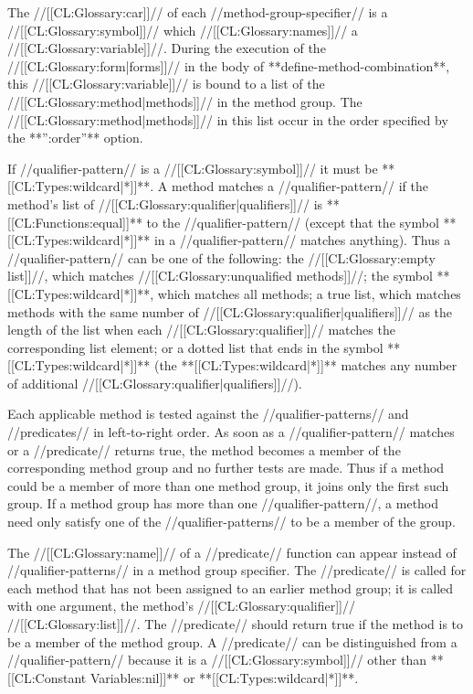 The //[[CL:Glossary:car]]// of each //method-group-specifier// is a //[[CL:Glossary:symbol]]// which //[[CL:Glossary:names]]// a //[[CL:Glossary:variable]]//. During the execution of the //[[CL:Glossary:form|forms]]// in the body of **define-method-combination**, this //[[CL:Glossary:variable]]// is bound to a list of the //[[CL:Glossary:method|methods]]// in the method group. The //[[CL:Glossary:method|methods]]// in this list occur in the order specified by the **'':order''** option.

If //qualifier-pattern// is a //[[CL:Glossary:symbol]]// it must be **[[CL:Types:wildcard|*]]**. A method matches a //qualifier-pattern// if the method's list of //[[CL:Glossary:qualifier|qualifiers]]// is **[[CL:Functions:equal]]** to the //qualifier-pattern// (except that the symbol **[[CL:Types:wildcard|*]]** in a //qualifier-pattern// matches anything). Thus a //qualifier-pattern// can be one of the following: the //[[CL:Glossary:empty list]]//, which matches //[[CL:Glossary:unqualified methods]]//; the symbol **[[CL:Types:wildcard|*]]**, which matches all methods; a true list, which matches methods with the same number of //[[CL:Glossary:qualifier|qualifiers]]// as the length of the list when each //[[CL:Glossary:qualifier]]// matches the corresponding list element; or a dotted list that ends in the symbol **[[CL:Types:wildcard|*]]** (the **[[CL:Types:wildcard|*]]** matches any number of additional //[[CL:Glossary:qualifier|qualifiers]]//).

Each applicable method is tested against the //qualifier-patterns// and //predicates// in left-to-right order. As soon as a //qualifier-pattern// matches or a //predicate// returns true, the method becomes a member of the corresponding method group and no further tests are made. Thus if a method could be a member of more than one method group, it joins only the first such group. If a method group has more than one //qualifier-pattern//, a method need only satisfy one of the //qualifier-patterns// to be a member of the group.

The //[[CL:Glossary:name]]// of a //predicate// function can appear instead of //qualifier-patterns// in a method group specifier. The //predicate// is called for each method that has not been assigned to an earlier method group; it is called with one argument, the method's //[[CL:Glossary:qualifier]]// //[[CL:Glossary:list]]//. The //predicate// should return true if the method is to be a member of the method group. A //predicate// can be distinguished from a //qualifier-pattern// because it is a //[[CL:Glossary:symbol]]// other than **[[CL:Constant Variables:nil]]** or **[[CL:Types:wildcard|*]]**.

